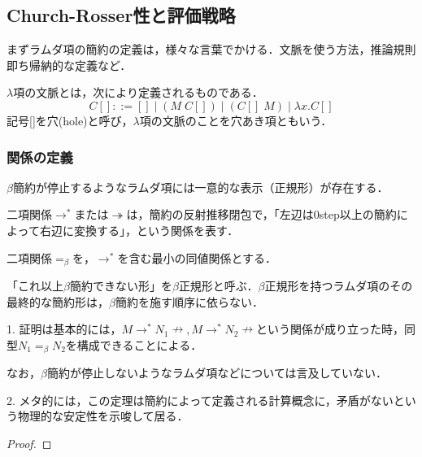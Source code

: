 \documentclass[uplatex, 12pt, dvipdfmx]{jsreport}
\begin{document}
\subsection{Church-Rosser性と評価戦略}
まずラムダ項の簡約の定義は，様々な言葉でかける．文脈を使う方法，推論規則即ち帰納的な定義など．

\begin{definition}[Context]
    $\lambda$項の文脈とは，次により定義されるものである．
    \[ C[]::=[]\mid (M\;C[])\mid (C[]\;M)\mid\lambda x.C[] \]
    記号[]を穴(hole)と呼び，$\lambda$項の文脈のことを穴あき項ともいう．
\end{definition}

\subsubsection*{関係の定義}
$\beta$簡約が停止するようなラムダ項には一意的な表示（正規形）が存在する．

\begin{definition}
    二項関係$\to^*$または$\twoheadrightarrow$は，簡約の反射推移閉包で，「左辺は0step以上の簡約によって右辺に変換する」，という関係を表す．
\end{definition}

\begin{definition}[$\beta$等価]
    二項関係$=_\beta$を，$\to^*$を含む最小の同値関係とする．
\end{definition}

\begin{theorem}
    「これ以上$\beta$簡約できない形」を$\beta$正規形と呼ぶ．$\beta$正規形を持つラムダ項のその最終的な簡約形は，$\beta$簡約を施す順序に依らない．
    \begin{center}
    \end{center}
\end{theorem}
\begin{remark}
    1. 証明は基本的には，$M\to^* N_1\nrightarrow, M\to^*N_2\nrightarrow$という関係が成り立った時，同型$N_1=_\beta N_2$を構成できることによる．

    なお，$\beta$簡約が停止しないようなラムダ項などについては言及していない．

    2. メタ的には，この定理は簡約によって定義される計算概念に，矛盾がないという物理的な安定性を示唆して居る．
\end{remark}
\begin{proof}
    
\end{proof}
\end{document}
